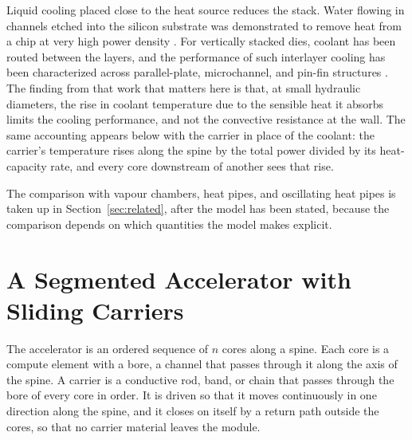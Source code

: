 \documentclass[11pt,openany]{book}
\theoremstyle{plain}
\theoremstyle{definition}
\theoremstyle{remark}
\begin{document}
Liquid cooling placed close to the heat source reduces the stack. Water flowing in channels etched into the silicon substrate was demonstrated to remove heat from a chip at very high power density \cite{tuckerman}. For vertically stacked dies, coolant has been routed between the layers, and the performance of such interlayer cooling has been characterized across parallel-plate, microchannel, and pin-fin structures \cite{brunschwiler}. The finding from that work that matters here is that, at small hydraulic diameters, the rise in coolant temperature due to the sensible heat it absorbs limits the cooling performance, and not the convective resistance at the wall. The same accounting appears below with the carrier in place of the coolant: the carrier's temperature rises along the spine by the total power divided by its heat-capacity rate, and every core downstream of another sees that rise.

The comparison with vapour chambers, heat pipes, and oscillating heat pipes is taken up in Section~\ref{sec:related}, after the model has been stated, because the comparison depends on which quantities the model makes explicit.
\section{A Segmented Accelerator with Sliding Carriers}
\label{sec:arch}

The accelerator is an ordered sequence of $n$ cores along a spine. Each core is a compute element with a bore, a channel that passes through it along the axis of the spine. A carrier is a conductive rod, band, or chain that passes through the bore of every core in order. It is driven so that it moves continuously in one direction along the spine, and it closes on itself by a return path outside the cores, so that no carrier material leaves the module.
\end{document}
